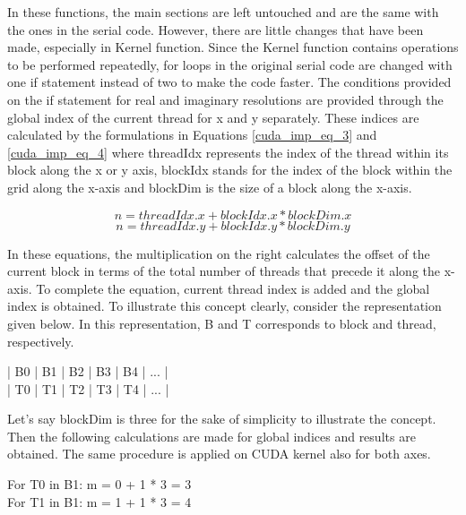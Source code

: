 \documentclass{article}
\begin{document}
In these functions, the main sections are left untouched and are the same with the ones in the serial code. However, there are little changes that have been made, especially in Kernel function. Since the Kernel function contains operations to be performed repeatedly, for loops in the original serial code are changed with one if statement instead of two to make the code faster. The conditions provided on the if statement for real and imaginary resolutions are provided through the global index of the current thread for x and y separately. These indices are calculated by the formulations in Equations \ref{cuda_imp_eq_3} and \ref{cuda_imp_eq_4} where threadIdx represents the index of the thread within its block along the x or y axis, blockIdx stands for the index of the block within the grid along the x-axis and blockDim is the size of a block along the x-axis. 

\begin{equation}  
    n = threadIdx.x + blockIdx.x * blockDim.x
    \label{cuda_imp_eq_3}
\end{equation}
\begin{equation}  
    n = threadIdx.y + blockIdx.y * blockDim.y
    \label{cuda_imp_eq_4}
\end{equation}

In these equations, the multiplication on the right calculates the offset of the current block in terms of the total number of threads that precede it along the x-axis. To complete the equation, current thread index is added and the global index is obtained. To illustrate this concept clearly, consider the representation given below. In this representation, B and T corresponds to block and thread, respectively. 

\begin{center}
    | B0 | B1 | B2 | B3 | B4 | ... |\\
    
    | T0 | T1 | T2 | T3 | T4 | ... |
\end{center}

Let's say blockDim is three for the sake of simplicity to illustrate the concept. Then the following calculations are made for global indices and results are obtained. The same procedure is applied on CUDA kernel also for both axes. \\

\begin{center}
    For T0 in B1: m = 0 + 1 * 3 = 3\\
    
    For T1 in B1: m = 1 + 1 * 3 = 4
\end{center} 
\end{document}
